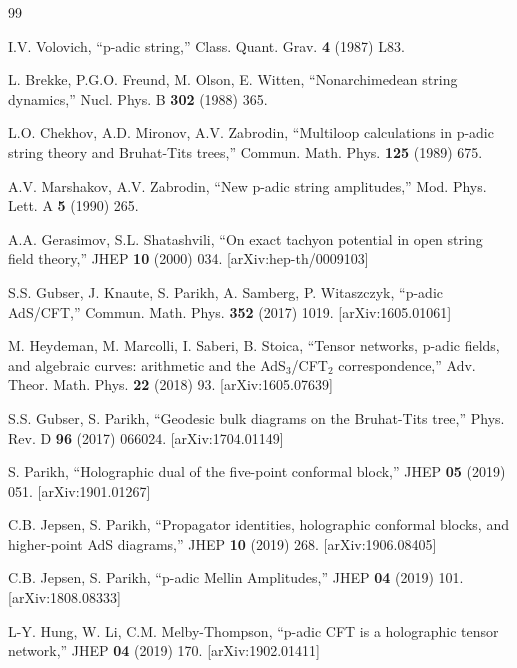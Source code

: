 \documentclass[11pt,a4paper]{ctexart}
\theoremstyle{remark}
\begin{document}
\begin{thebibliography}{99}


 I.V. Volovich, ``p-adic string,'' Class. Quant. Grav. \textbf{4} (1987) L83.

 L. Brekke, P.G.O. Freund, M. Olson, E. Witten, ``Nonarchimedean string dynamics,'' Nucl. Phys. B \textbf{302} (1988) 365.

 L.O. Chekhov, A.D. Mironov, A.V. Zabrodin, ``Multiloop calculations in p-adic string theory and Bruhat-Tits trees,'' Commun. Math. Phys. \textbf{125} (1989) 675.

 A.V. Marshakov, A.V. Zabrodin, ``New p-adic string amplitudes,'' Mod. Phys. Lett. A \textbf{5} (1990) 265.

 A.A. Gerasimov, S.L. Shatashvili, ``On exact tachyon potential in open string field theory,'' JHEP \textbf{10} (2000) 034. [arXiv:hep-th/0009103]


 S.S. Gubser, J. Knaute, S. Parikh, A. Samberg, P. Witaszczyk, ``p-adic AdS/CFT,'' Commun. Math. Phys. \textbf{352} (2017) 1019. [arXiv:1605.01061]

 M. Heydeman, M. Marcolli, I. Saberi, B. Stoica, ``Tensor networks, p-adic fields, and algebraic curves: arithmetic and the AdS$_3$/CFT$_2$ correspondence,'' Adv. Theor. Math. Phys. \textbf{22} (2018) 93. [arXiv:1605.07639]

 S.S. Gubser, S. Parikh, ``Geodesic bulk diagrams on the Bruhat-Tits tree,'' Phys. Rev. D \textbf{96} (2017) 066024. [arXiv:1704.01149]

 S. Parikh, ``Holographic dual of the five-point conformal block,'' JHEP \textbf{05} (2019) 051. [arXiv:1901.01267]

 C.B. Jepsen, S. Parikh, ``Propagator identities, holographic conformal blocks, and higher-point AdS diagrams,'' JHEP \textbf{10} (2019) 268. [arXiv:1906.08405]

 C.B. Jepsen, S. Parikh, ``p-adic Mellin Amplitudes,'' JHEP \textbf{04} (2019) 101. [arXiv:1808.08333]

 L-Y. Hung, W. Li, C.M. Melby-Thompson, ``p-adic CFT is a holographic tensor network,'' JHEP \textbf{04} (2019) 170. [arXiv:1902.01411]


\end{thebibliography}
\end{document}
